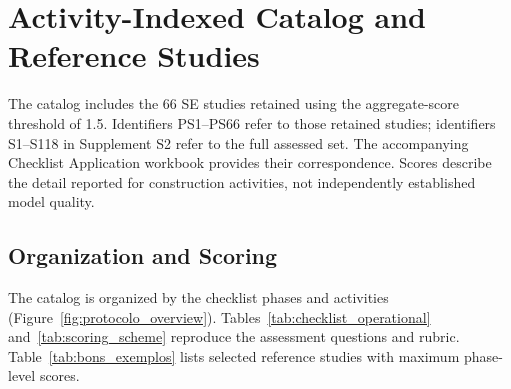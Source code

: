 \section{Activity-Indexed Catalog and Reference Studies}
\label{app:protocolo}

The catalog includes the 66 SE studies retained using the aggregate-score threshold of 1.5. Identifiers PS1--PS66 refer to those retained studies; identifiers S1--S118 in Supplement S2 refer to the full assessed set. The accompanying Checklist Application workbook provides their correspondence. Scores describe the detail reported for construction activities, not independently established model quality.

\subsection{Organization and Scoring}

The catalog is organized by the checklist phases and activities (Figure~\ref{fig:protocolo_overview}). Tables~\ref{tab:checklist_operational} and~\ref{tab:scoring_scheme} reproduce the assessment questions and rubric. Table~\ref{tab:bons_exemplos} lists selected reference studies with maximum phase-level scores.

